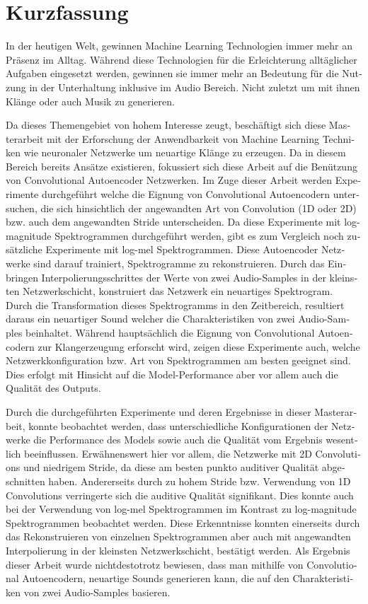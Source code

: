 \chapter{Kurzfassung}

\begin{german}
In der heutigen Welt, gewinnen Machine Learning Technologien immer mehr an Präsenz im Alltag. Während diese Technologien für die Erleichterung alltäglicher Aufgaben eingesetzt werden, gewinnen sie immer mehr an Bedeutung für die Nutzung in der Unterhaltung inklusive im Audio Bereich. Nicht zuletzt um mit ihnen Klänge oder auch Musik zu generieren. 

Da dieses Themengebiet von hohem Interesse zeugt, beschäftigt sich diese Masterarbeit mit der Erforschung der Anwendbarkeit von Machine Learning Techniken wie neuronaler Netzwerke um neuartige Klänge zu erzeugen. Da in diesem Bereich bereits Ansätze existieren, fokussiert sich diese Arbeit auf die Benützung von Convolutional Autoencoder Netzwerken. Im Zuge dieser Arbeit werden Experimente durchgeführt welche die Eignung von Convolutional Autoencodern untersuchen, die sich hinsichtlich der angewandten Art von Convolution (1D oder 2D) bzw. auch dem angewandten Stride unterscheiden. Da diese Experimente mit log-magnitude Spektrogrammen durchgeführt werden, gibt es zum Vergleich noch zusätzliche Experimente mit log-mel Spektrogrammen. Diese Autoencoder Netzwerke sind darauf trainiert, Spektrogramme zu rekonstruieren. Durch das Einbringen Interpolierungsschrittes der Werte von zwei Audio-Samples in der kleinsten Netzwerkschicht, konstruiert das Netzwerk ein neuartiges Spektrogram. Durch die Transformation dieses Spektrogramms in den Zeitbereich, resultiert daraus ein neuartiger Sound welcher die Charakteristiken von zwei Audio-Samples beinhaltet. Während hauptsächlich die Eignung von Convolutional Autoencodern zur Klangerzeugung erforscht wird, zeigen diese Experimente auch, welche Netzwerkkonfiguration bzw. Art von Spektrogrammen am besten geeignet sind. Dies erfolgt mit Hinsicht auf die Model-Performance aber vor allem auch die Qualität des Outputs.

Durch die durchgeführten Experimente und deren Ergebnisse in dieser Masterarbeit, konnte beobachtet werden, dass unterschiedliche Konfigurationen der Netzwerke die Performance des Models sowie auch die Qualität vom Ergebnis wesentlich beeinflussen. Erwähnenswert hier vor allem, die Netzwerke mit 2D Convolutions und niedrigem Stride, da diese am besten punkto auditiver Qualität abgeschnitten haben. Andererseits durch zu hohem Stride bzw. Verwendung von 1D Convolutions verringerte sich die auditive Qualität signifikant. Dies konnte auch bei der Verwendung von log-mel Spektrogrammen im Kontrast zu log-magnitude Spektrogrammen beobachtet werden. Diese Erkenntnisse konnten einerseits durch das Rekonstruieren von einzelnen Spektrogrammen aber auch mit angewandten Interpolierung in der kleinsten Netzwerkschicht, bestätigt werden. Als Ergebnis dieser Arbeit wurde nichtdestotrotz bewiesen, dass man mithilfe von Convolutional Autoencodern, neuartige Sounds generieren kann, die auf den Charakteristiken von zwei Audio-Samples basieren.

\end{german}